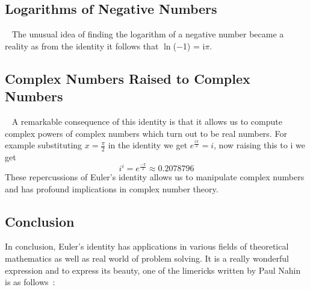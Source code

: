 \documentclass{article}
\begin{document}
\subsection*{Logarithms of Negative Numbers}~\cite{nair2018euler}
\noindent The unusual idea of finding the logarithm of a negative number became a reality as from the
identity it follows that $\ln$(−1) = i$\pi$.

\subsection*{Complex Numbers Raised to Complex Numbers}~\cite{nair2018euler}
\noindent A remarkable consequence of this identity is that it allows us to compute complex powers of complex numbers which turn out to be real numbers. For
example substituting $x = \frac{\pi}{2}$
in the identity we get $e^{\frac{i\pi}{2}}=i$, now raising this to i we get
$$i^{i} = e^{\frac{-\pi}{2}} \approx 0.2078796$$
These repercussions of Euler’s identity allows us to manipulate complex numbers
and has profound implications in complex number theory.

\subsection*{Conclusion}
\noindent In conclusion, Euler's identity has applications in various fields of theoretical mathematics as well as real world of problem solving. It is a really wonderful expression and to express its beauty, one of the limericks written by Paul Nahin is as follows~\cite{nahin2011dr}: \\

\begin{figure}[h] 
	\begin{center}
	\end{center}
\end{figure}



\end{document}
